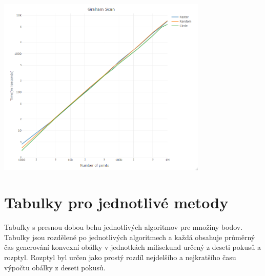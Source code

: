 \documentclass[12pt]{article}
\begin{document}
\begin{center}
   \includegraphics[width=10cm]{./img/plot_graham_scan.png}
\end{center}

\section{Tabulky pro jednotlivé metody}
Tabuľky s presnou dobou behu jednotlivých algoritmov pre množiny bodov. Tabulky jsou rozdělené po jednotlivých algoritmech a každá obsahuje průměrný čas generování konvexní obálky v jednotkách milisekund určený z deseti pokusů a rozptyl. Rozptyl byl určen jako prostý rozdíl nejdelšího a nejkratšího času výpočtu obálky z deseti pokusů.
\end{document}
